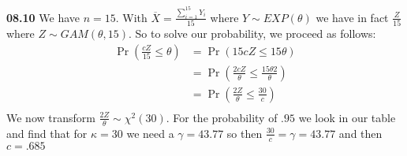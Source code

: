 {\bf 08.10} We have $n = 15$. With $\overline{X} = \frac{\sum_{i=1}^{15} Y_i}{15}$ where $Y \sim EXP(\theta)$ we have
in fact $\frac{Z}{15}$ where $Z \sim GAM(\theta,15)$. So to solve our probability, we proceed as follows: \\

\begin{align*}
	\Pr \left( \frac{c Z}{15} \leq \theta \right) & = \Pr \left( 15 c Z  \leq 15 \theta \right) \\
	& = \Pr \left( \frac{ 2 c Z }{\theta} \leq \frac{15 \theta 2}{\theta} \right) \\
	& = \Pr \left( \frac{ 2 Z }{\theta} \leq \frac{30}{c} \right) \\
\end{align*}
We now transform $\frac{ 2 Z }{\theta} \sim \chi^2 (30)$. For the probability of $.95$ we look in our table and
find that for $\kappa = 30$ we need a $\gamma = 43.77$ so then $\frac{30}{c} = \gamma = 43.77$ and then $c = .685$
